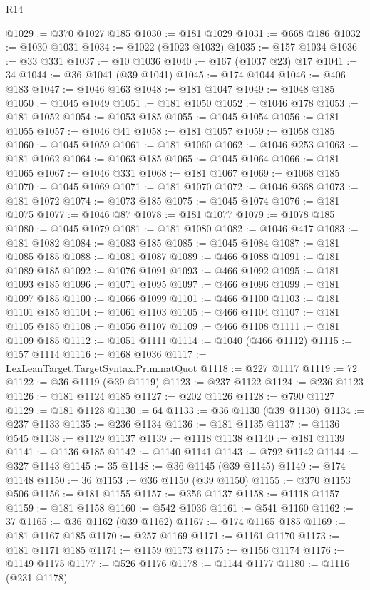 \begin{lexlean}{R14}
\begin{coremodule}
@1029 := @370 @1027 @185
@1030 := @181 @1029
@1031 := @668 @186
@1032 := @1030 @1031
@1034 := @1022 (@1023 @1032)
@1035 := @157 @1034
@1036 := @33 @331
@1037 := @10 @1036
@1040 := @167 (@1037 @23) @17
@1041 := 34
@1044 := @36 @1041 (@39 @1041)
@1045 := @174 @1044
@1046 := @406 @183
@1047 := @1046 @163
@1048 := @181 @1047
@1049 := @1048 @185
@1050 := @1045 @1049
@1051 := @181 @1050
@1052 := @1046 @178
@1053 := @181 @1052
@1054 := @1053 @185
@1055 := @1045 @1054
@1056 := @181 @1055
@1057 := @1046 @41
@1058 := @181 @1057
@1059 := @1058 @185
@1060 := @1045 @1059
@1061 := @181 @1060
@1062 := @1046 @253
@1063 := @181 @1062
@1064 := @1063 @185
@1065 := @1045 @1064
@1066 := @181 @1065
@1067 := @1046 @331
@1068 := @181 @1067
@1069 := @1068 @185
@1070 := @1045 @1069
@1071 := @181 @1070
@1072 := @1046 @368
@1073 := @181 @1072
@1074 := @1073 @185
@1075 := @1045 @1074
@1076 := @181 @1075
@1077 := @1046 @87
@1078 := @181 @1077
@1079 := @1078 @185
@1080 := @1045 @1079
@1081 := @181 @1080
@1082 := @1046 @417
@1083 := @181 @1082
@1084 := @1083 @185
@1085 := @1045 @1084
@1087 := @181 @1085 @185
@1088 := @1081 @1087
@1089 := @466 @1088
@1091 := @181 @1089 @185
@1092 := @1076 @1091
@1093 := @466 @1092
@1095 := @181 @1093 @185
@1096 := @1071 @1095
@1097 := @466 @1096
@1099 := @181 @1097 @185
@1100 := @1066 @1099
@1101 := @466 @1100
@1103 := @181 @1101 @185
@1104 := @1061 @1103
@1105 := @466 @1104
@1107 := @181 @1105 @185
@1108 := @1056 @1107
@1109 := @466 @1108
@1111 := @181 @1109 @185
@1112 := @1051 @1111
@1114 := @1040 (@466 @1112)
@1115 := @157 @1114
@1116 := @168 @1036
@1117 := LexLeanTarget.TargetSyntax.Prim.natQuot
@1118 := @227 @1117
@1119 := 72
@1122 := @36 @1119 (@39 @1119)
@1123 := @237 @1122
@1124 := @236 @1123
@1126 := @181 @1124 @185
@1127 := @202 @1126
@1128 := @790 @1127
@1129 := @181 @1128
@1130 := 64
@1133 := @36 @1130 (@39 @1130)
@1134 := @237 @1133
@1135 := @236 @1134
@1136 := @181 @1135
@1137 := @1136 @545
@1138 := @1129 @1137
@1139 := @1118 @1138
@1140 := @181 @1139
@1141 := @1136 @185
@1142 := @1140 @1141
@1143 := @792 @1142
@1144 := @327 @1143
@1145 := 35
@1148 := @36 @1145 (@39 @1145)
@1149 := @174 @1148
@1150 := 36
@1153 := @36 @1150 (@39 @1150)
@1155 := @370 @1153 @506
@1156 := @181 @1155
@1157 := @356 @1137
@1158 := @1118 @1157
@1159 := @181 @1158
@1160 := @542 @1036
@1161 := @541 @1160
@1162 := 37
@1165 := @36 @1162 (@39 @1162)
@1167 := @174 @1165 @185
@1169 := @181 @1167 @185
@1170 := @257 @1169
@1171 := @1161 @1170
@1173 := @181 @1171 @185
@1174 := @1159 @1173
@1175 := @1156 @1174
@1176 := @1149 @1175
@1177 := @526 @1176
@1178 := @1144 @1177
@1180 := @1116 (@231 @1178)

\end{coremodule}
\end{lexlean}
